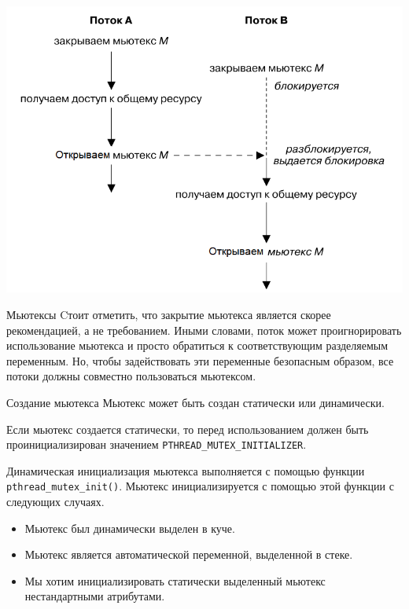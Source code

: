 \documentclass{beamer}
\begin{document}
\begin{frame}{}
    \centering
    \includegraphics[scale=0.5]{mutex.png}
\end{frame}

\begin{frame}{Мьютексы}
    Cтоит отметить, что закрытие мьютекса является скорее рекомендацией, а не требованием. Иными словами, поток может проигнорировать использование мьютекса и просто обратиться к соответствующим разделяемым переменным. Но, чтобы задействовать эти переменные безопасным образом, все потоки должны совместно пользоваться мьютексом.
\end{frame}

\begin{frame}{Создание мьютекса}
    Мьютекс может быть создан статически или динамически.
    
    Если мьютекс создается статически, то перед использованием должен быть проинициализирован значением \texttt{PTHREAD\_MUTEX\_INITIALIZER}. 
    
    Динамическая инициализация мьютекса выполняется с помощью функции \texttt{pthread\_mutex\_init()}. Мьютекс инициализируется с помощью этой функции с следующих случаях. \begin{itemize}
        \item Мьютекс был динамически выделен в куче.
        \item Мьютекс является автоматической переменной, выделенной в стеке.
        \item Мы хотим инициализировать статически выделенный мьютекс нестандартными атрибутами.
    \end{itemize}
\end{frame}
\end{document}
